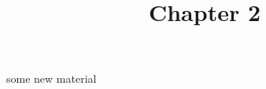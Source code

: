 \documentclass[11pt]{article}
\begin{document}
    
    \title{Chapter 2}
    \date{}
    \maketitle
    
    
    
    \section*{}
    some new material
    
    
\end{document}
